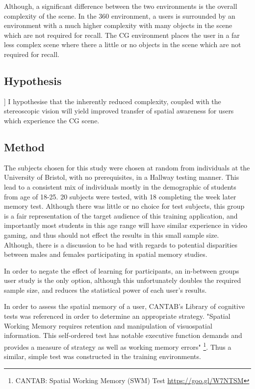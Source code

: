 \documentclass[a4paper, openright, twoside]{report}
\begin{document}
Although, a significant difference between the two environments is the overall complexity of the scene. In the 360 environment, a users is surrounded by an environment with a much higher complexity with many objects in the scene which are not required for recall. The CG environment places the user in a far less complex scene where there a little or no objects in the scene which are not required for recall.

\subsection{Hypothesis}]
I hypothesise that the inherently reduced complexity, coupled with the stereoscopic vision will yield improved transfer of spatial awareness for users which experience the CG scene.


\subsection{Method}
The subjects chosen for this study were chosen at random from individuals at the University of Bristol, with no prerequisites, in a Hallway testing manner. This lead to a consistent mix of individuals mostly in the demographic of students from age of 18-25. 20 subjects were tested, with 18 completing the week later memory test. Although there was little or no choice for test subjects, this group is a fair representation of the target audience of this training application, and importantly most students in this age range will have similar experience in video gaming, and thus should not effect the results in this small sample size. Although, there is a discussion to be had with regards to potential disparities between males and females participating in spatial memory studies. 

In order to negate the effect of learning for participants, an in-between groups user study is the only option, although this unfortunately doubles the required sample size, and reduces the statistical power of  each user's results. 

In order to assess the spatial memory of a user, CANTAB's Library of cognitive tests was referenced in order to determine an appropriate strategy. "Spatial Working Memory requires retention and manipulation of visuospatial information. This self-ordered test has notable executive function demands and provides a measure of strategy as well as working memory errors" \footnote{ CANTAB: Spatial Working Memory (SWM) Test \url{https://goo.gl/W7NTSM}}. Thus a similar, simple test was constructed in the training environments. 
\end{document}
